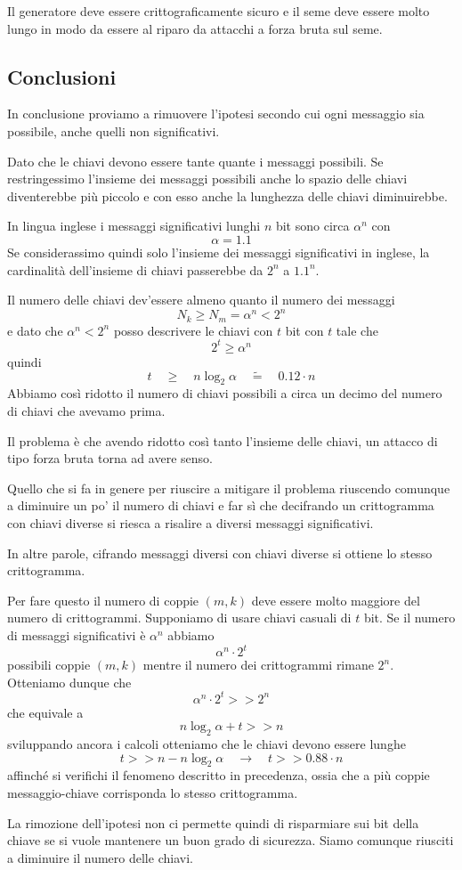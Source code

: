 Il generatore deve essere crittograficamente sicuro e il seme deve essere molto lungo in modo da essere al riparo da
attacchi a forza bruta sul seme.

\subsection{Conclusioni}\label{conclusioni_otp}
In conclusione proviamo a rimuovere l'ipotesi secondo cui ogni messaggio sia possibile, anche quelli non significativi.

Dato che le chiavi devono essere tante quante i messaggi possibili. Se restringessimo l'insieme dei messaggi possibili
anche lo spazio delle chiavi diventerebbe pi\`u piccolo e con esso anche la lunghezza delle chiavi diminuirebbe.

In lingua inglese i messaggi significativi lunghi $n$ bit sono circa $\alpha^n$ con
\[ \alpha = 1.1 \]
Se considerassimo quindi solo l'insieme dei messaggi significativi in inglese, la cardinalit\`a dell'insieme di chiavi
passerebbe da $2^n$ a $1.1^n$.

Il numero delle chiavi dev'essere almeno quanto il numero dei messaggi
\[ N_k \geq N_m = \alpha^n < 2^n \]
e dato che $\alpha^n < 2^n$ posso descrivere le chiavi con $t$ bit con $t$ tale che
\[ 2^t \geq \alpha^n \]
quindi
\[ t \quad \geq \quad n \log_2 \alpha \quad \tilde{=} \quad 0.12 \cdot n \]
Abbiamo cos\`i ridotto il numero di chiavi possibili a circa un decimo del numero di chiavi che avevamo prima.

Il problema \`e che avendo ridotto cos\`i tanto l'insieme delle chiavi, un attacco di tipo forza bruta torna ad avere
senso.

Quello che si fa in genere per riuscire a mitigare il problema riuscendo comunque a diminuire un po' il numero di chiavi
e far s\`i che decifrando un crittogramma con chiavi diverse si riesca a risalire a diversi messaggi significativi.

In altre parole, cifrando messaggi diversi con chiavi diverse si ottiene lo stesso crittogramma.

Per fare questo il numero di coppie $(m, k)$ deve essere molto maggiore del numero di crittogrammi. Supponiamo di usare
chiavi casuali di $t$ bit. Se il numero di messaggi significativi \`e $\alpha^n$ abbiamo
\[ \alpha^n \cdot 2^t \]
possibili coppie $(m, k)$ mentre il numero dei crittogrammi rimane $2^n$. Otteniamo dunque che
\[ \alpha^n \cdot 2^t >> 2^n \]
che equivale a
\[ n \log_2 \alpha + t >> n \]
sviluppando ancora i calcoli otteniamo che le chiavi devono essere lunghe
\[ t >> n - n\log_2 \alpha \quad \rightarrow \quad t >> 0.88 \cdot n \]
affinch\'e si verifichi il fenomeno descritto in precedenza, ossia che a pi\`u coppie messaggio-chiave corrisponda lo
stesso crittogramma.

La rimozione dell'ipotesi non ci permette quindi di risparmiare sui bit della chiave se si vuole mantenere un buon grado
di sicurezza. Siamo comunque riusciti a diminuire il numero delle chiavi.